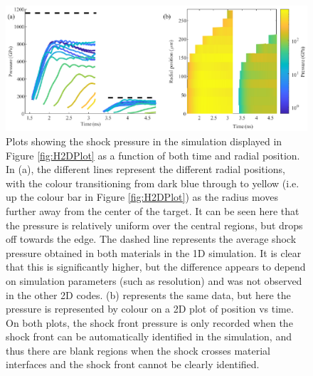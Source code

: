 \begin{figure}[hbt!]
\centering
\includegraphics[width=1\textwidth]{figures/Experiment/H2DPressure.eps}%
\caption{\label{fig:H2DPressure} Plots showing the shock pressure in the simulation displayed in Figure \ref{fig:H2DPlot} as a function of both time and radial position. In (a), the different lines represent the different radial positions, with the colour transitioning from dark blue through to yellow (i.e. up the colour bar in Figure \ref{fig:H2DPlot}) as the radius moves further away from the center of the target. It can be seen here that the pressure is relatively uniform over the central regions, but drops off towards the edge. The dashed line represents the average shock pressure obtained in both materials in the 1D simulation. It is clear that this is significantly higher, but the difference appears to depend on simulation parameters (such as resolution) and was not observed in the other 2D codes. (b) represents the same data, but here the pressure is represented by colour on a 2D plot of position vs time. On both plots, the shock front pressure is only recorded when the shock front can be automatically identified in the simulation, and thus there are blank regions when the shock crosses material interfaces and the shock front cannot be clearly identified.}
\end{figure}

